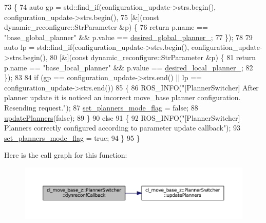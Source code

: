 \begin{DoxyCode}
73 \{
74   \textcolor{keyword}{auto} gp = std::find\_if(configuration\_update->strs.begin(), configuration\_update->strs.begin(),
75                          [&](\textcolor{keyword}{const} dynamic\_reconfigure::StrParameter &p) \{
76                            \textcolor{keywordflow}{return} p.name == \textcolor{stringliteral}{"base\_global\_planner"} && p.value == 
      \hyperlink{classcl__move__base__z_1_1PlannerSwitcher_aef047d3778b2993c1df146bbad43e03d}{desired\_global\_planner\_};
77                          \});
78 
79   \textcolor{keyword}{auto} lp = std::find\_if(configuration\_update->strs.begin(), configuration\_update->strs.begin(),
80                          [&](\textcolor{keyword}{const} dynamic\_reconfigure::StrParameter &p) \{
81                            \textcolor{keywordflow}{return} p.name == \textcolor{stringliteral}{"base\_local\_planner"} && p.value == 
      \hyperlink{classcl__move__base__z_1_1PlannerSwitcher_a6cbf65f11bb69125f913caaabdf7b4cf}{desired\_local\_planner\_};
82                          \});
83 
84   \textcolor{keywordflow}{if} (gp == configuration\_update->strs.end() || lp == configuration\_update->strs.end())
85   \{
86     ROS\_INFO(\textcolor{stringliteral}{"[PlannerSwitcher] After planner update it is noticed an incorrect move\_base planner
       configuration. Resending request."});
87     \hyperlink{classcl__move__base__z_1_1PlannerSwitcher_a6c14fd001513787ed213704e2d3dc383}{set\_planners\_mode\_flag} = \textcolor{keyword}{false};
88     \hyperlink{classcl__move__base__z_1_1PlannerSwitcher_a146641f63aea3185daab4c5cbb789550}{updatePlanners}(\textcolor{keyword}{false});
89   \}
90   \textcolor{keywordflow}{else}
91   \{
92     ROS\_INFO(\textcolor{stringliteral}{"[PlannerSwitcher] Planners correctly configured according to parameter update callback"});
93     \hyperlink{classcl__move__base__z_1_1PlannerSwitcher_a6c14fd001513787ed213704e2d3dc383}{set\_planners\_mode\_flag} = \textcolor{keyword}{true};
94   \}
95 \}
\end{DoxyCode}


Here is the call graph for this function\+:
\nopagebreak
\begin{figure}[H]
\begin{center}
\leavevmode
\includegraphics[width=350pt]{classcl__move__base__z_1_1PlannerSwitcher_ad9371bd8d62600ef874e8914c3ec177b_cgraph}
\end{center}
\end{figure}




